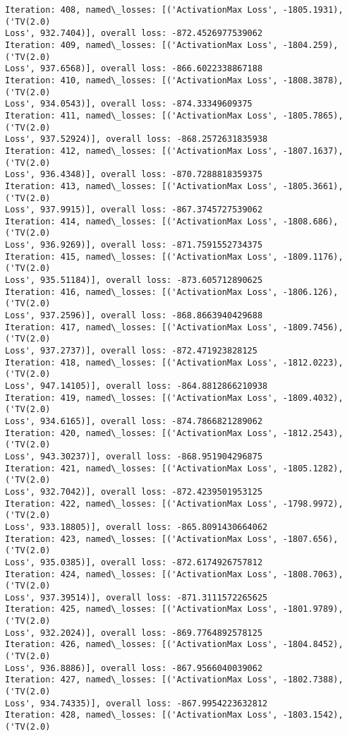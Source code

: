 \documentclass[10pt]{article}
\begin{document}
\begin{Verbatim}[commandchars=\\\{\}]
Iteration: 408, named\_losses: [('ActivationMax Loss', -1805.1931), ('TV(2.0)
Loss', 932.7404)], overall loss: -872.4526977539062
Iteration: 409, named\_losses: [('ActivationMax Loss', -1804.259), ('TV(2.0)
Loss', 937.6568)], overall loss: -866.6022338867188
Iteration: 410, named\_losses: [('ActivationMax Loss', -1808.3878), ('TV(2.0)
Loss', 934.0543)], overall loss: -874.33349609375
Iteration: 411, named\_losses: [('ActivationMax Loss', -1805.7865), ('TV(2.0)
Loss', 937.52924)], overall loss: -868.2572631835938
Iteration: 412, named\_losses: [('ActivationMax Loss', -1807.1637), ('TV(2.0)
Loss', 936.4348)], overall loss: -870.7288818359375
Iteration: 413, named\_losses: [('ActivationMax Loss', -1805.3661), ('TV(2.0)
Loss', 937.9915)], overall loss: -867.3745727539062
Iteration: 414, named\_losses: [('ActivationMax Loss', -1808.686), ('TV(2.0)
Loss', 936.9269)], overall loss: -871.7591552734375
Iteration: 415, named\_losses: [('ActivationMax Loss', -1809.1176), ('TV(2.0)
Loss', 935.51184)], overall loss: -873.605712890625
Iteration: 416, named\_losses: [('ActivationMax Loss', -1806.126), ('TV(2.0)
Loss', 937.2596)], overall loss: -868.8663940429688
Iteration: 417, named\_losses: [('ActivationMax Loss', -1809.7456), ('TV(2.0)
Loss', 937.2737)], overall loss: -872.471923828125
Iteration: 418, named\_losses: [('ActivationMax Loss', -1812.0223), ('TV(2.0)
Loss', 947.14105)], overall loss: -864.8812866210938
Iteration: 419, named\_losses: [('ActivationMax Loss', -1809.4032), ('TV(2.0)
Loss', 934.6165)], overall loss: -874.7866821289062
Iteration: 420, named\_losses: [('ActivationMax Loss', -1812.2543), ('TV(2.0)
Loss', 943.30237)], overall loss: -868.951904296875
Iteration: 421, named\_losses: [('ActivationMax Loss', -1805.1282), ('TV(2.0)
Loss', 932.7042)], overall loss: -872.4239501953125
Iteration: 422, named\_losses: [('ActivationMax Loss', -1798.9972), ('TV(2.0)
Loss', 933.18805)], overall loss: -865.8091430664062
Iteration: 423, named\_losses: [('ActivationMax Loss', -1807.656), ('TV(2.0)
Loss', 935.0385)], overall loss: -872.6174926757812
Iteration: 424, named\_losses: [('ActivationMax Loss', -1808.7063), ('TV(2.0)
Loss', 937.39514)], overall loss: -871.3111572265625
Iteration: 425, named\_losses: [('ActivationMax Loss', -1801.9789), ('TV(2.0)
Loss', 932.2024)], overall loss: -869.7764892578125
Iteration: 426, named\_losses: [('ActivationMax Loss', -1804.8452), ('TV(2.0)
Loss', 936.8886)], overall loss: -867.9566040039062
Iteration: 427, named\_losses: [('ActivationMax Loss', -1802.7388), ('TV(2.0)
Loss', 934.74335)], overall loss: -867.9954223632812
Iteration: 428, named\_losses: [('ActivationMax Loss', -1803.1542), ('TV(2.0)

\end{Verbatim}
\end{document}
